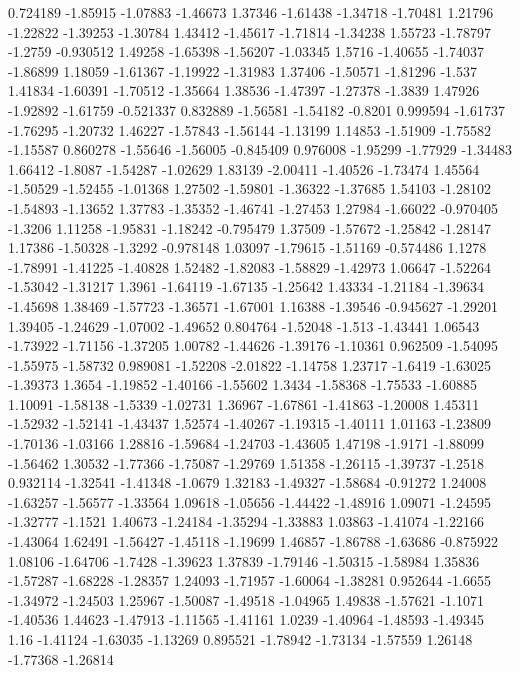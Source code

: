 \documentclass[9pt]{article}
\theoremstyle{plain}
\theoremstyle{definition}
\theoremstyle{remark}
\numberwithin{equation}{section}
\begin{document}
0.724189
-1.85915
-1.07883
-1.46673
1.37346
-1.61438
-1.34718
-1.70481
1.21796
-1.22822
-1.39253
-1.30784
1.43412
-1.45617
-1.71814
-1.34238
1.55723
-1.78797
-1.2759
-0.930512
1.49258
-1.65398
-1.56207
-1.03345
1.5716
-1.40655
-1.74037
-1.86899
1.18059
-1.61367
-1.19922
-1.31983
1.37406
-1.50571
-1.81296
-1.537
1.41834
-1.60391
-1.70512
-1.35664
1.38536
-1.47397
-1.27378
-1.3839
1.47926
-1.92892
-1.61759
-0.521337
0.832889
-1.56581
-1.54182
-0.8201
0.999594
-1.61737
-1.76295
-1.20732
1.46227
-1.57843
-1.56144
-1.13199
1.14853
-1.51909
-1.75582
-1.15587
0.860278
-1.55646
-1.56005
-0.845409
0.976008
-1.95299
-1.77929
-1.34483
1.66412
-1.8087
-1.54287
-1.02629
1.83139
-2.00411
-1.40526
-1.73474
1.45564
-1.50529
-1.52455
-1.01368
1.27502
-1.59801
-1.36322
-1.37685
1.54103
-1.28102
-1.54893
-1.13652
1.37783
-1.35352
-1.46741
-1.27453
1.27984
-1.66022
-0.970405
-1.3206
1.11258
-1.95831
-1.18242
-0.795479
1.37509
-1.57672
-1.25842
-1.28147
1.17386
-1.50328
-1.3292
-0.978148
1.03097
-1.79615
-1.51169
-0.574486
1.1278
-1.78991
-1.41225
-1.40828
1.52482
-1.82083
-1.58829
-1.42973
1.06647
-1.52264
-1.53042
-1.31217
1.3961
-1.64119
-1.67135
-1.25642
1.43334
-1.21184
-1.39634
-1.45698
1.38469
-1.57723
-1.36571
-1.67001
1.16388
-1.39546
-0.945627
-1.29201
1.39405
-1.24629
-1.07002
-1.49652
0.804764
-1.52048
-1.513
-1.43441
1.06543
-1.73922
-1.71156
-1.37205
1.00782
-1.44626
-1.39176
-1.10361
0.962509
-1.54095
-1.55975
-1.58732
0.989081
-1.52208
-2.01822
-1.14758
1.23717
-1.6419
-1.63025
-1.39373
1.3654
-1.19852
-1.40166
-1.55602
1.3434
-1.58368
-1.75533
-1.60885
1.10091
-1.58138
-1.5339
-1.02731
1.36967
-1.67861
-1.41863
-1.20008
1.45311
-1.52932
-1.52141
-1.43437
1.52574
-1.40267
-1.19315
-1.40111
1.01163
-1.23809
-1.70136
-1.03166
1.28816
-1.59684
-1.24703
-1.43605
1.47198
-1.9171
-1.88099
-1.56462
1.30532
-1.77366
-1.75087
-1.29769
1.51358
-1.26115
-1.39737
-1.2518
0.932114
-1.32541
-1.41348
-1.0679
1.32183
-1.49327
-1.58684
-0.91272
1.24008
-1.63257
-1.56577
-1.33564
1.09618
-1.05656
-1.44422
-1.48916
1.09071
-1.24595
-1.32777
-1.1521
1.40673
-1.24184
-1.35294
-1.33883
1.03863
-1.41074
-1.22166
-1.43064
1.62491
-1.56427
-1.45118
-1.19699
1.46857
-1.86788
-1.63686
-0.875922
1.08106
-1.64706
-1.7428
-1.39623
1.37839
-1.79146
-1.50315
-1.58984
1.35836
-1.57287
-1.68228
-1.28357
1.24093
-1.71957
-1.60064
-1.38281
0.952644
-1.6655
-1.34972
-1.24503
1.25967
-1.50087
-1.49518
-1.04965
1.49838
-1.57621
-1.1071
-1.40536
1.44623
-1.47913
-1.11565
-1.41161
1.0239
-1.40964
-1.48593
-1.49345
1.16
-1.41124
-1.63035
-1.13269
0.895521
-1.78942
-1.73134
-1.57559
1.26148
-1.77368
-1.26814
\end{document}
